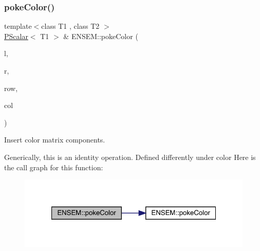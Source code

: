 \subsubsection{\texorpdfstring{pokeColor()}{pokeColor()}\hspace{0.1cm}{\footnotesize\ttfamily [2/2]}}
{\footnotesize\ttfamily template$<$class T1 , class T2 $>$ \\
\mbox{\hyperlink{classENSEM_1_1PScalar}{P\+Scalar}}$<$ T1 $>$ \& E\+N\+S\+E\+M\+::poke\+Color (\begin{DoxyParamCaption}\item[{\mbox{\hyperlink{classENSEM_1_1PScalar}{P\+Scalar}}$<$ T1 $>$ \&}]{l,  }\item[{const \mbox{\hyperlink{classENSEM_1_1PScalar}{P\+Scalar}}$<$ T2 $>$ \&}]{r,  }\item[{int}]{row,  }\item[{int}]{col }\end{DoxyParamCaption})\hspace{0.3cm}{\ttfamily [inline]}}



Insert color matrix components. 

Generically, this is an identity operation. Defined differently under color Here is the call graph for this function\+:\nopagebreak
\begin{figure}[H]
\begin{center}
\leavevmode
\includegraphics[width=321pt]{db/dcc/group__primscalar_ga540606e7a9a4e2fbb97da4a95bc1c21f_cgraph}
\end{center}
\end{figure}
\mbox{\label{group__primscalar_gaef0821cb16093e96134a98e5a765c45a}} 
